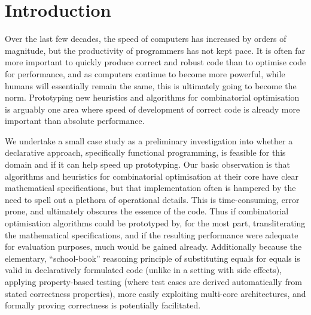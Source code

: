 \section{Introduction}

Over the last few decades, the speed of computers has increased by orders of
magnitude, but the productivity of programmers has not kept pace. It is often far more
important to quickly produce correct and robust code than to optimise code for
performance, and as computers continue to become more powerful, while humans
will essentially remain the same, this is ultimately going to become the norm.
Prototyping new heuristics and algorithms for combinatorial optimisation is
arguably one area where speed of development of correct code is already more
important than absolute performance.

We undertake a small case study as a preliminary investigation
into whether a declarative approach, specifically functional programming, is
feasible for this domain and if it can help speed up prototyping. Our
basic observation is that algorithms and heuristics for combinatorial
optimisation at their core have clear mathematical specifications, but that
implementation often is hampered by the need to spell out a plethora of
operational details. This is time-consuming, error prone, and ultimately
obscures the essence of the code. Thus if combinatorial optimisation
algorithms could be prototyped by, for the most part, transliterating the
mathematical specifications, and if the resulting performance were adequate
for evaluation purposes, much would be gained already.
Additionally because the elementary, ``school-book'' reasoning principle of
substituting equals for equals is valid in declaratively formulated code
(unlike in a setting with side effects), applying property-based testing
\cite{quickcheck} (where test cases are derived automatically from stated
correctness properties), more easily exploiting multi-core architectures, and formally proving correctness is potentially facilitated.


